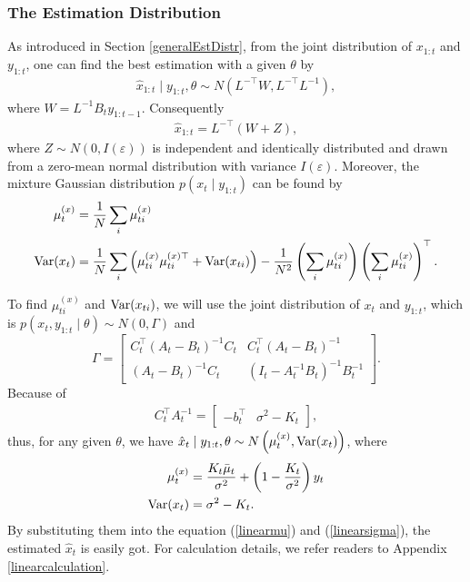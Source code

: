 \subsubsection*{The Estimation Distribution}

As introduced in Section \ref{generalEstDistr}, from the joint distribution of $x_{1:t}$ and $y_{1:t}$, one can find the best estimation with a given $\theta$ by
\begin{align*}
\hat{x}_{1:t} \mid y_{1:t},\theta \sim N\left(L^{-\top}W,L^{-\top}L^{-1}\right),
\end{align*}
where $W = L^{-1}B_{t}y_{1:t-1}$. 
Consequently 
\begin{align*}
\hat{x}_{1:t} = L^{-\top}(W+Z),
\end{align*}
where $Z \sim N\left(0, I(\varepsilon)\right)$ is independent and identically distributed and drawn from a zero-mean normal distribution with variance $ I(\varepsilon)$. Moreover, the mixture Gaussian distribution $p(x_t \mid y_{1:t})$ can be found by 
\begin{align}
\mu_t^{(x)} &= \frac{1}{N} \sum_i \mu_{ti}^{(x)} \label{linearmu}  \\
\mathrm{Var}(x_t) &= \frac{1}{N} \sum_i \left( \mu_{ti}^{(x)}  \mu_{ti}^{(x)\top} +\mathrm{Var}(x_{ti})\right) -\frac{1}{N^2} \left(  \sum_i  \mu_{ti}^{(x)} \right) \left( \sum_i \mu_{ti}^{(x)} \right) ^\top.\label{linearsigma} 
\end{align}


To find $\mu_{ti}^{(x)}$ and $\mathrm{Var}(x_{ti})$, we will use the joint distribution of $x_{t}$ and $y_{1:t}$, which is $p(x_{t}, y_{1:t}  \mid  \theta)\sim N(0,\Gamma)$ and 
\begin{equation*}
\Gamma=\begin{bmatrix} C_{t}^\top(A_t-B_t)^{-1}C_{t} & C_{t}^\top(A_t-B_t)^{-1}\\(A_t-B_t)^{-1}C_{t} & (I_t-A_t^{-1}B_t)^{-1}B_t^{-1} \end{bmatrix}.
\end{equation*}
Because of 
\begin{align*}
C_{t}^\top A_{t}^{-1} = \begin{bmatrix} - b_{t}^\top & \sigma^2- K_{t} \end{bmatrix},
\end{align*}
thus, for any given $\theta$, we have $\hat{x}_{t}\mid y_{1:t},\theta \sim N\left( \mu_{t}^{(x)},\mathrm{Var}(x_t) \right)$, where
\begin{align}
\mu_{t}^{(x)} &  =  \frac{K_{t}\bar{\mu}_{t}}{\sigma^2}+\left(1-\frac{K_{t}}{\sigma^2}\right)y_{t} \\
\mathrm{Var}(x_t)&= \sigma^2-K_{t}.
\end{align}
By substituting them into the equation (\ref{linearmu}) and (\ref{linearsigma}), the estimated $\hat{x}_t$ is easily got. For calculation details, we refer readers to Appendix \ref{linearcalculation}.


